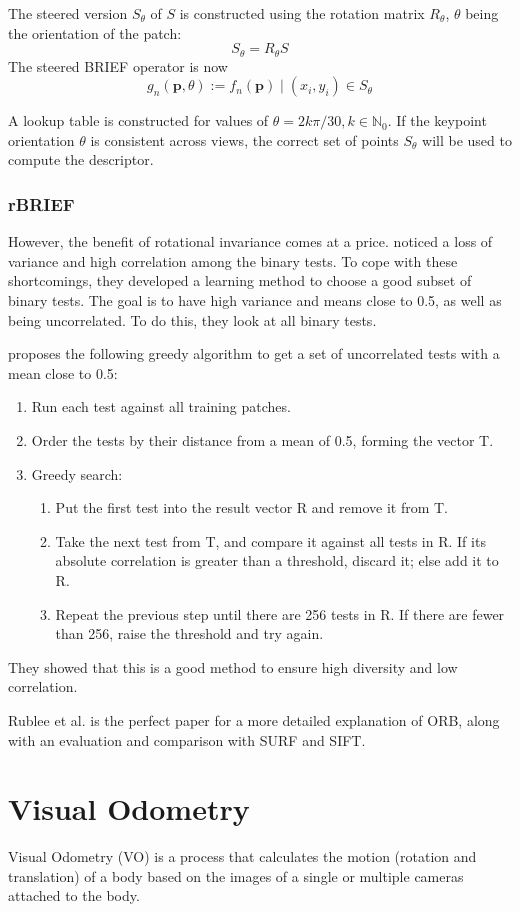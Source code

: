 The steered version $S_\theta$ of $S$ is constructed using the rotation matrix $R_\theta$, $\theta$ being the orientation of the patch:
\begin{equation}
    S_\theta = R_\theta S
\end{equation}
The steered BRIEF operator is now
\begin{equation}
    g_n(\boldsymbol{p},\theta):=f_n(\boldsymbol{p})\mid(x_i,y_i)\in S_\theta
\end{equation}

A lookup table is constructed for values of $\theta = 2k\pi/30, k \in \mathbb{N}_0$. If the keypoint orientation $\theta$ is consistent across views, the correct set of points $S_\theta$ will be used to compute the descriptor.

\subsubsection{rBRIEF}
However, the benefit of rotational invariance comes at a price. \cite{6126544} noticed a loss of variance and high correlation among the binary tests. To cope with these shortcomings, they developed a learning method to choose a good subset of binary tests. The goal is to have high variance and means close to 0.5, as well as being uncorrelated. To do this, they look at all binary tests.\bigskip

\cite{6126544} proposes the following greedy algorithm to get a set of uncorrelated tests with a mean close to 0.5:
\begin{enumerate}
    \item Run each test  against all training patches.\smallskip
    \item Order the tests by their distance from a mean of 0.5, forming the vector T.\smallskip
    \item Greedy search:\smallskip
    \begin{enumerate}
        \item Put the first test into the result vector R and remove it from T.\smallskip
        \item Take the next test from T, and compare it against all tests in R. If its absolute correlation is greater than a threshold, discard it; else add it to R.\smallskip
        \item Repeat the previous step until there are 256 tests in R. If there are fewer than 256, raise the threshold and try again.\smallskip
    \end{enumerate}
\end{enumerate}

They showed that this is a good method to ensure high diversity and low correlation.\bigskip

Rublee et al.\cite{6126544} is the perfect paper for a more detailed explanation of ORB, along with an evaluation and comparison with SURF and SIFT. 

\section{Visual Odometry}
Visual Odometry (VO) is a process that calculates the motion (rotation and translation) of a body based on the images of a single or multiple cameras attached to the body. 